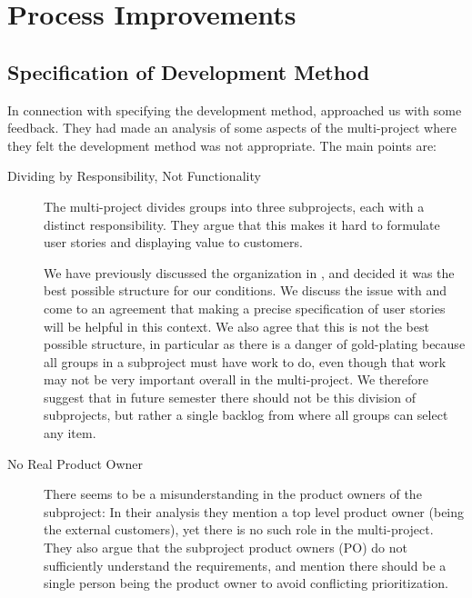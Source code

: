 \chapter{Process Improvements}
\dummy

\section{Specification of Development Method}
In connection with specifying the development method,  approached us with some feedback. They had made an analysis of some aspects of the multi-project where they felt the development method was not appropriate. The main points are:
\begin{description}
  \item[Dividing by Responsibility, Not Functionality] The multi-project divides groups into three subprojects, each with a distinct responsibility. They argue that this makes it hard to formulate user stories and displaying value to customers.

  We have previously discussed the organization in , and decided it was the best possible structure for our conditions. We discuss the issue with  and come to an agreement that making a precise specification of user stories will be helpful in this context. We also agree that this is not the best possible structure, in particular as there is a danger of gold-plating because all groups in a subproject must have work to do, even though that work may not be very important overall in the multi-project. We therefore suggest that in future semester there should not be this division of subprojects, but rather a single backlog from where all groups can select any item.
  \item[No Real Product Owner] There seems to be a misunderstanding in the product owners of the subproject: In their analysis they mention a top level product owner (being the external customers), yet there is no such role in the multi-project. They also argue that the subproject product owners (PO) do not sufficiently understand the requirements, and mention there should be a single person being the product owner to avoid conflicting prioritization.


\end{description}
